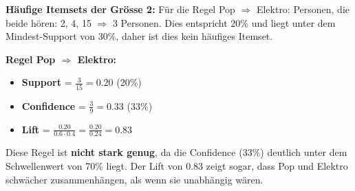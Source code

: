 \begin{myexercise}
\begin{myanswer}
        \textbf{Häufige Itemsets der Grösse 2:} Für die Regel Pop $\Rightarrow$ Elektro:
        Personen, die beide hören: 2, 4, 15 $\Rightarrow$ 3 Personen. Dies entspricht 20\% und liegt unter dem Mindest-Support von 30\%, daher ist dies kein häufiges Itemset.

        \textbf{Regel Pop $\Rightarrow$ Elektro:}
        \begin{itemize}
            \item \textbf{Support} = $\frac{3}{15} = 0.20$ (20\%)
            \item \textbf{Confidence} = $\frac{3}{9} = 0.33$ (33\%)
            \item \textbf{Lift} = $\frac{0.20}{0.6 \cdot 0.4} = \frac{0.20}{0.24} = 0.83$
        \end{itemize}

        Diese Regel ist \textbf{nicht stark genug}, da die Confidence (33\%) deutlich unter dem Schwellenwert von 70\% liegt. Der Lift von 0.83 zeigt sogar, dass Pop und Elektro schwächer zusammenhängen, als wenn sie unabhängig wären.
    \end{myanswer}

\end{myexercise}

